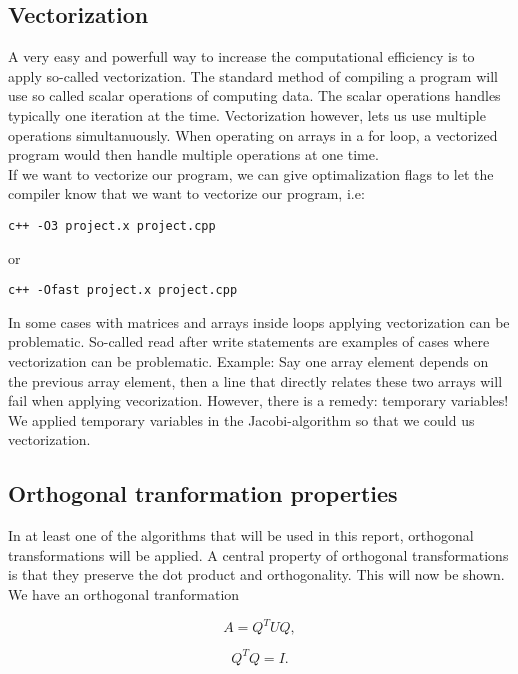 \documentclass{article}
\begin{document}
\subsection{Vectorization}
A very easy and powerfull way to increase the computational efficiency is to apply so-called vectorization. The standard method of compiling a program will use so called scalar operations of computing data. The scalar operations handles typically one iteration at the time. Vectorization however, lets us use multiple operations simultanuously. When operating on arrays in a for loop, a vectorized program would then handle multiple operations at one time. \\

If we want to vectorize our program, we can give optimalization flags to let the compiler know that we want to vectorize our program, i.e:
\begin{lstlisting}
c++ -O3 project.x project.cpp
\end{lstlisting}
or 
\begin{lstlisting}
c++ -Ofast project.x project.cpp
\end{lstlisting}

In some cases with matrices and arrays inside loops applying vectorization can be problematic. So-called read after write statements are examples of cases where vectorization can be problematic. Example: Say one array element depends on the previous array element, then a line that directly relates these two arrays will fail when applying vecorization. However, there is a remedy: temporary variables! We applied temporary variables in the Jacobi-algorithm so that we could us vectorization.

\subsection{Orthogonal tranformation properties}
In at least one of the algorithms that will be used in this report, orthogonal transformations will be applied. A central property of orthogonal transformations is that they preserve the dot product and orthogonality. This will now be shown.\\

We have an orthogonal tranformation

\begin{equation}
A = Q^T U Q,
\end{equation}

\begin{equation}
Q^T Q = I.
\end{equation}
\end{document}
